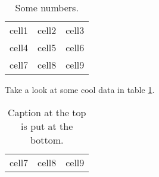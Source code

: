 \documentclass{article}
\begin{document}
  \begin{table}[h]
    \begin{tabular}{ c c c }
       cell1 & cell2 & cell3 \\
       cell4 & cell5 & cell6 \\
       cell7 & cell8 & cell9
    \end{tabular}
    \caption{Some numbers.}
    \label{table:1}
  \end{table}

  Take a look at some cool data in table \ref{table:1}.

  \begin{table}[h]
    \caption{Caption at the top is put at the bottom.}
    \begin{tabular}{ c c c }
       cell7 & cell8 & cell9
    \end{tabular}
  \end{table}
\end{document}
